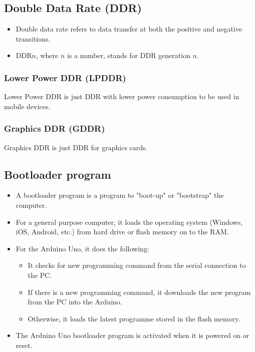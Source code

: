 \documentclass[11pt]{article}
\begin{document}
\subsection{Double Data Rate (DDR)}
\label{sec:orgfa5a47a}
\begin{itemize}
\item Double data rate refers to data transfer at both the positive and negative transitions.
\item DDR\(n\), where \(n\) is a number, stands for DDR generation \(n\).
\end{itemize}

\subsubsection{Lower Power DDR (LPDDR)}
\label{sec:orgd3d07ad}
Lower Power DDR is just DDR with lower power consumption to be used in mobile devices.

\subsubsection{Graphics DDR (GDDR)}
\label{sec:orgb2142b8}
Graphics DDR is just DDR for graphics cards.

\subsection{Bootloader program}
\label{sec:org57750fa}
\begin{itemize}
\item A bootloader program is a program to "boot-up" or "bootstrap" the computer.
\item For a general purpose computer, it loads the operating system (Windows, iOS, Android, etc.) from hard drive or flash memory on to the RAM.
\item For the Arduino Uno, it does the following:
\begin{itemize}
\item It checks for new programming command from the serial connection to the PC.
\item If there is a new programming command, it downloads the new program from the PC into the Arduino.
\item Otherwise, it loads the latest programme stored in the flash memory.
\end{itemize}
\item The Arduino Uno bootloader program is activated when it is powered on or reset.
\end{itemize}
\end{document}
